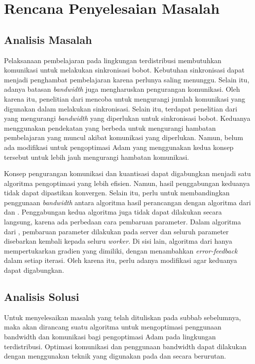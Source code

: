 \chapter{Rencana Penyelesaian Masalah}

\section{Analisis Masalah}

Pelaksanaan pembelajaran pada lingkungan terdistribusi membutuhkan komunikasi untuk melakukan sinkronisasi bobot. Kebutuhan sinkronisasi dapat menjadi penghambat pembelajaran karena perlunya saling menunggu. Selain itu, adanya batasan \emph{bandwidth} juga mengharuskan pengurangan komunikasi. Oleh karena itu, penelitian dari \textcite{Chen2021CADA} mencoba untuk mengurangi jumlah komunikasi yang digunakan dalam melakukan sinkronisasi. Selain itu, terdapat penelitian dari \textcite{Chen2022Efficient} yang mengurangi \emph{bandwidth} yang diperlukan untuk sinkronisasi bobot. Keduanya menggunakan pendekatan yang berbeda untuk mengurangi hambatan pembelajaran yang muncul akibat komunikasi yang diperlukan. Namun, belum ada modifikasi untuk pengoptimasi Adam yang menggunakan kedua konsep tersebut untuk lebih jauh mengurangi hambatan komunikasi.

Konsep pengurangan komunikasi dan kuantisasi dapat digabungkan menjadi satu algoritma pengoptimasi yang lebih efisien. Namun, hasil penggabungan keduanya tidak dapat dipastikan konvergen. Selain itu, perlu untuk membandingkan penggunaan \emph{bandwidth} antara algoritma hasil perancangan dengan algoritma dari \textcite{Chen2021CADA} dan \textcite{Chen2022Efficient}. Penggabungan kedua algoritma juga tidak dapat dilakukan secara langsung, karena ada perbedaan cara pembaruan parameter. Dalam algoritma dari \textcite{Chen2021CADA}, pembaruan parameter dilakukan pada server dan seluruh parameter disebarkan kembali kepada seluru \emph{worker}. Di sisi lain, algoritma dari \textcite{Chen2022Efficient} hanya mempertukarkan gradien yang dimiliki, dengan menambahkan \emph{error-feedback} dalam setiap iterasi. Oleh karena itu, perlu adanya modifikasi agar keduanya dapat digabungkan.

\section{Analisis Solusi}
Untuk menyelesaikan masalah yang telah dituliskan pada subbab sebelumnya, maka akan dirancang suatu algoritma untuk mengoptimasi penggunaan bandwidth dan komunikasi bagi pengoptimasi Adam pada lingkungan terdistribusi. Optimasi komunikasi dan penggunaan bandwidth dapat dilakukan dengan menggunakan teknik yang digunakan pada \textcite{Chen2021CADA} dan \textcite{Chen2022Efficient} secara berurutan.

